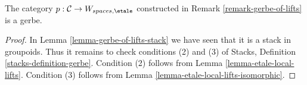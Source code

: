 \begin{lemma}
\label{lemma-gerbe-of-lifts}
The category $p : \mathcal{C} \to W_{spaces, \etale}$ constructed
in Remark \ref{remark-gerbe-of-lifts} is a gerbe.
\end{lemma}

\begin{proof}
In Lemma \ref{lemma-gerbe-of-lifts-stack}
we have seen that it is a stack in groupoids.
Thus it remains to check conditions (2) and (3) of
Stacks, Definition \ref{stacks-definition-gerbe}.
Condition (2) follows from
Lemma \ref{lemma-etale-local-lifts}.
Condition (3) follows from
Lemma \ref{lemma-etale-local-lifts-isomorphic}.
\end{proof}
















